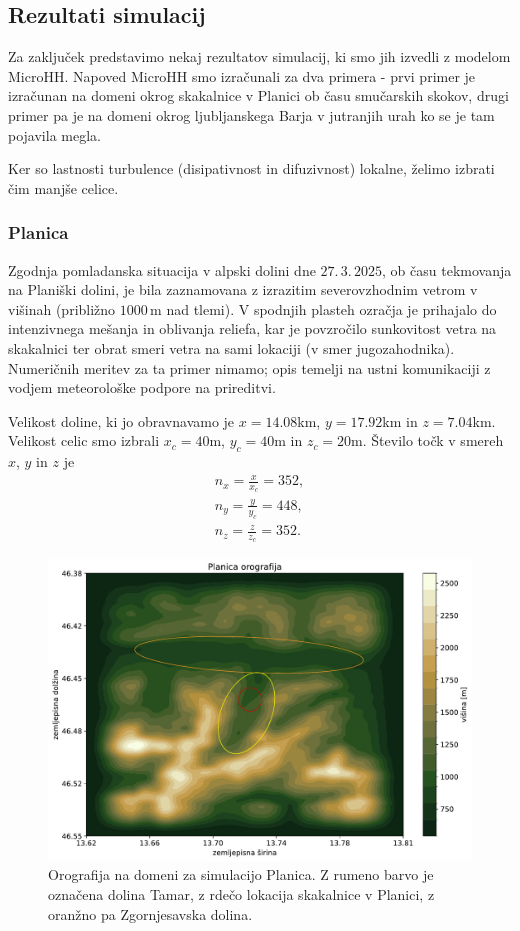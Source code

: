 \documentclass[mat2, tisk]{fmfdelo}
\begin{document}
\subsection{Rezultati simulacij}

Za zaključek predstavimo nekaj rezultatov simulacij, ki smo jih izvedli z modelom MicroHH.
Napoved MicroHH smo izračunali za dva primera - prvi primer je 
izračunan na domeni okrog skakalnice v Planici ob času smučarskih
skokov, drugi primer pa je na domeni okrog ljubljanskega Barja v 
jutranjih urah ko se je tam pojavila megla.

Ker so lastnosti turbulence (disipativnost in difuzivnost) lokalne, želimo 
izbrati čim manjše celice.

\subsubsection{Planica}
Zgodnja pomladanska situacija v alpski
dolini dne \(27.\,3.\,2025\), ob času tekmovanja na 
Planiški dolini, je bila zaznamovana z izrazitim 
severovzhodnim vetrom v višinah 
(približno \(1000\,\mathrm{m}\) nad tlemi). V 
spodnjih plasteh ozračja je prihajalo do intenzivnega 
mešanja in oblivanja reliefa, kar je povzročilo 
sunkovitost vetra na skakalnici ter obrat smeri vetra 
na sami lokaciji (v smer jugozahodnika). Numeričnih 
meritev za ta primer nimamo; opis temelji na ustni 
komunikaciji z vodjem meteorološke podpore na 
prireditvi.

Velikost doline, ki jo obravnavamo je 
$x = 14.08$km, $y = 17.92$km in $z = 7.04$km. Velikost celic smo izbrali
$x_c=40$m, $y_c=40$m in $z_c=20$m. Število točk v smereh $x$, $y$ in $z$ je 
\begin{align*}
n_x = \frac{x}{x_c} = 352, \\
n_y = \frac{y}{y_c} = 448, \\
n_z = \frac{z}{z_c} = 352.
\end{align*}

\begin{figure}[h!]
  \centering
  \includegraphics[width=\textwidth]{rezultati/planica_orografija.pdf}
  \caption{Orografija na domeni za simulacijo Planica. Z rumeno barvo je označena dolina Tamar, z rdečo lokacija skakalnice v Planici, z oranžno pa Zgornjesavska dolina.}
  \label{fig:planica_combined}
\end{figure}
\end{document}
